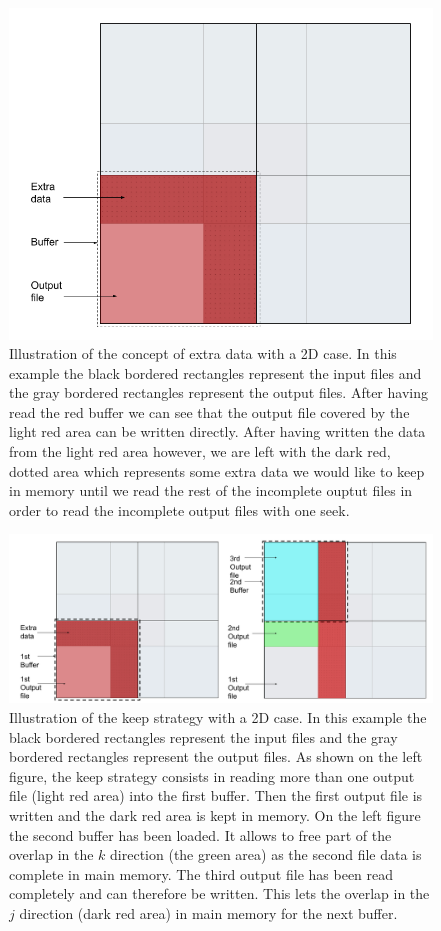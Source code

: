 \documentclass[conference]{IEEEtran}
\begin{document}
\begin{figure}[h]
\centering
\includegraphics[scale=0.3]{./figures/overlap.png}
\caption{Illustration of the concept of extra data with a 2D case. In this example the black bordered rectangles represent the input files and the gray bordered rectangles represent the output files. After having read the red buffer we can see that the output file covered by the light red area can be written directly. After having written the data from the light red area however, we are left with the dark red, dotted area which represents some extra data we would like to keep in memory until we read the rest of the incomplete ouptut files in order to read the incomplete output files with one seek.
}
\label{fig:overlap}
\end{figure}

\begin{figure}[h]
\centering
\includegraphics[scale=0.3]{./figures/keep_strategy.png}
\caption{Illustration of the keep strategy with a 2D case. In this example the black bordered rectangles represent the input files and the gray bordered rectangles represent the output files. As shown on the left figure, the keep strategy consists in reading more than one output file (light red area) into the first buffer. Then the first output file is written and the dark red area is kept in memory. On the left figure the second buffer has been loaded. It allows to free part of the overlap in the $k$ direction (the green area) as the second file data is complete in main memory. The third output file has been read completely and can therefore be written. This lets the overlap in the $j$ direction (dark red area) in main memory for the next buffer.
}
\label{fig:keepstrategy}
\end{figure}
\end{document}
